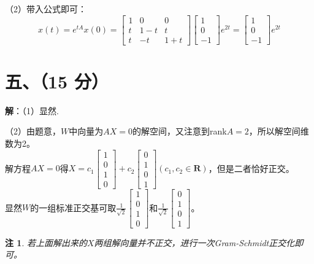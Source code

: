 \documentclass[11pt, a4paper]{article}
\newtheorem{sign}{注}
\begin{document}
（2）带入公式即可：
$$x(t)=e^{tA}x(0)=\begin{bmatrix} 1 & 0 & 0\\t & 1-t & t \\  t&-t  & 1+t \end{bmatrix}\begin{bmatrix} 1 \\ 0 \\ -1 \end{bmatrix}e^{2t}=\begin{bmatrix} 1 \\ 0 \\ -1 \end{bmatrix}e^{2t}$$


\section*{五、（15 分）}
\textbf{解}：（1）显然.

（2）由题意，$W$中向量为$AX = 0$的解空间，又注意到rank$A=2$，所以解空间维数为2。\\

解方程$AX = 0$得$X = c_1\begin{bmatrix} 1 \\ 0 \\ 1\\ 0\end{bmatrix}+c_2\begin{bmatrix} 0 \\ 1 \\ 0\\ 1\end{bmatrix}(c_1,c_2\in \mathbf{R})$，但是二者恰好正交。\\

显然$W$的一组标准正交基可取$\displaystyle\frac{1}{\sqrt{2}}\begin{bmatrix} 1 \\ 0 \\ 1\\ 0\end{bmatrix}$和$\displaystyle\frac{1}{\sqrt{2}}\begin{bmatrix} 0 \\ 1 \\ 0\\ 1\end{bmatrix}$。

\begin{sign}
若上面解出来的$X$两组解向量并不正交，进行一次Gram-Schmidt正交化即可。
\end{sign}
\end{document}
